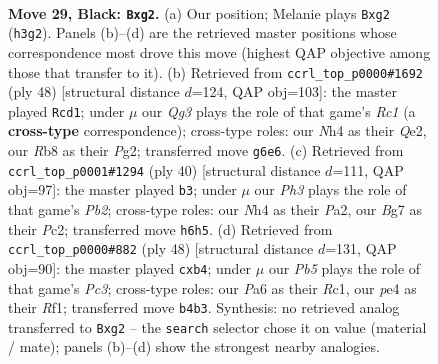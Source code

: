 \documentclass[11pt]{article}
\begin{document}
\clearpage

\begin{figure}[p]\centering
\begin{subfigure}{0.46\textwidth}\centering
\resizebox{\linewidth}{!}{%
\newchessgame
\chessboard[
  setfen={nr1r2k1/5pb1/p5qp/2Q1p3/1p2P2n/3P1P1b/PP1B1RB1/RN2N1K1 b - - 2 29},
  showmover=false,
  pgfstyle=straightmove, color=movearrow, markmove={h3-g2}
]}
\caption{}
\end{subfigure}\hfill
\begin{subfigure}{0.46\textwidth}\centering
\resizebox{\linewidth}{!}{%
\newchessgame
\chessboard[
  setfen={2r1r1k1/4b1p1/pp2p2p/2n1P1q1/3Nb3/1P3BB1/P3Q1PP/2R2R1K w - - 0 25},
  showmover=false,
  pgfstyle=straightmove, color=movearrow, markmove={c1-d1}
]}
\caption{}
\end{subfigure}
\\[4pt]
\begin{subfigure}{0.46\textwidth}\centering
\resizebox{\linewidth}{!}{%
\newchessgame
\chessboard[
  setfen={2r1r1k1/1p3pp1/p2p3p/4n3/2bQPNPq/7P/PPP1B3/1K1R3R w - - 2 21},
  showmover=false,
  pgfstyle=straightmove, color=movearrow, markmove={b2-b3}
]}
\caption{}
\end{subfigure}\hfill
\begin{subfigure}{0.46\textwidth}\centering
\resizebox{\linewidth}{!}{%
\newchessgame
\chessboard[
  setfen={2r1kbr1/1p4q1/2n1p3/1NnpPp1p/1p2bB2/2P1QNP1/P1B2P2/2R2RK1 w - - 0 25},
  showmover=false,
  pgfstyle=straightmove, color=movearrow, markmove={c3-b4}
]}
\caption{}
\end{subfigure}
\caption{\textbf{Move 29, Black: \texttt{Bxg2}.} (a) Our position; Melanie plays \texttt{Bxg2} (\texttt{h3g2}). Panels (b)--(d) are the retrieved master positions whose correspondence most drove this move (highest QAP objective among those that transfer to it). (b) Retrieved from \texttt{ccrl\_top\_p0000\#1692} (ply 48) [structural distance $d$=124, QAP obj=103]: the master played \texttt{Rcd1}; under $\mu$ our \emph{Qg3} plays the role of that game's \emph{Rc1} (a \textbf{cross-type} correspondence); cross-type roles: our \emph{N}h4 as their \emph{Q}e2, our \emph{R}b8 as their \emph{P}g2; transferred move \texttt{g6e6}. (c) Retrieved from \texttt{ccrl\_top\_p0001\#1294} (ply 40) [structural distance $d$=111, QAP obj=97]: the master played \texttt{b3}; under $\mu$ our \emph{Ph3} plays the role of that game's \emph{Pb2}; cross-type roles: our \emph{N}h4 as their \emph{P}a2, our \emph{B}g7 as their \emph{P}c2; transferred move \texttt{h6h5}. (d) Retrieved from \texttt{ccrl\_top\_p0000\#882} (ply 48) [structural distance $d$=131, QAP obj=90]: the master played \texttt{cxb4}; under $\mu$ our \emph{Pb5} plays the role of that game's \emph{Pc3}; cross-type roles: our \emph{P}a6 as their \emph{R}c1, our \emph{p}e4 as their \emph{R}f1; transferred move \texttt{b4b3}. Synthesis: no retrieved analog transferred to \texttt{Bxg2} -- the \texttt{search} selector chose it on value (material / mate); panels (b)--(d) show the strongest nearby analogies.}
\label{fig:thought-m57}
\end{figure}
\end{document}
